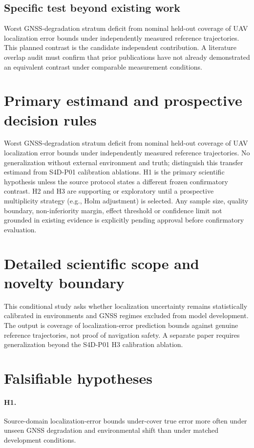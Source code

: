 \documentclass[11pt,a4paper]{article}
\begin{document}
\subsection{Specific test beyond existing work}
Worst GNSS-degradation stratum deficit from nominal held-out coverage of UAV localization error bounds under independently measured reference trajectories. This planned contrast is the candidate independent contribution. A literature overlap audit must confirm that prior publications have not already demonstrated an equivalent contrast under comparable measurement conditions.

\section{Primary estimand and prospective decision rules}
Worst GNSS-degradation stratum deficit from nominal held-out coverage of UAV localization error bounds under independently measured reference trajectories. No generalization without external environment and truth; distinguish this transfer estimand from S4D-P01 calibration ablations. H1 is the primary scientific hypothesis unless the source protocol states a different frozen confirmatory contrast. H2 and H3 are supporting or exploratory until a prospective multiplicity strategy (e.g., Holm adjustment) is selected. Any sample size, quality boundary, non-inferiority margin, effect threshold or confidence limit not grounded in existing evidence is explicitly pending approval before confirmatory evaluation.

\section{Detailed scientific scope and novelty boundary}
This conditional study asks whether localization uncertainty remains statistically calibrated in environments and GNSS regimes excluded from model development. The output is coverage of localization-error prediction bounds against genuine reference trajectories, not proof of navigation safety. A separate paper requires generalization beyond the S4D-P01 H3 calibration ablation.

\section{Falsifiable hypotheses}
\paragraph{H1.} Source-domain localization-error bounds under-cover true error more often under unseen GNSS degradation and environmental shift than under matched development conditions.
\end{document}
